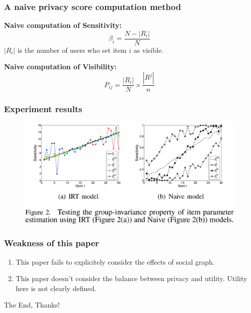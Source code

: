 \documentclass{beamer}
\begin{document}
% 
\begin{frame}
  \frametitle{A naive privacy score computation method}

  \textbf{Naive computation of Sensitivity:}
  \[\beta_i=\frac{N-|R_i|}{N}\] 
  $|R_i|$ is the number of users who set item $i$ as visible. %

  \textbf{Naive computation of Visibility:}
  \[P_{ij}=\frac{|R_i|}{N}\times \frac{|R^j|}{n}\]%
\end{frame}

\begin{frame}
  \frametitle{Experiment results}
  \begin{figure}
    \begin{center}
    \includegraphics[scale=0.25]{result}
  \end{center}
  \end{figure}
\end{frame}

\begin{frame}
  \frametitle{Weakness of this paper}
  \begin{enumerate}
    \item This paper fails to explicitely consider the effects of
      social graph. 
    \item This paper doesn't consider the balance between privacy and
      utility. Utility here is not clearly defined. 
  \end{enumerate} 
\end{frame}

\begin{frame}
  \centerline{The End, Thanks!}
\end{frame}
\end{document}
